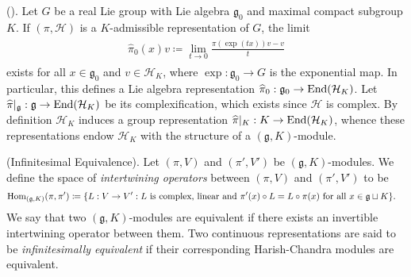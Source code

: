 \noindent\begin{theorem}\textup{(\cite[Theorem 0.3.5]{Vog81}).}\label{ContinuousgKForward} Let $G$ be a real Lie group with Lie algebra $\mathfrak{g}_0$ and maximal compact subgroup $K$. If $(\pi, \mathcal{H})$ is a $K$-admissible representation of $G$, the limit
\begin{align*}
\begin{split}
\widehat{\pi}_0(x)v \coloneqq \lim_{t\to 0}\frac{\pi(\exp(tx))v - v}{t}
\end{split}
\end{align*}
exists for all $x \in \mathfrak{g}_0$ and $v \in \mathcal{H}_K$, where $\exp : \mathfrak{g}_0 \to G$ is the exponential map. In particular, this defines a Lie algebra representation $\widehat{\pi}_0 : \mathfrak{g}_0 \to \textup{End}(\mathcal{H}_K)$. Let $\widehat{\pi}\vert_\mathfrak{g} : \mathfrak{g} \to \textup{End}(\mathcal{H}_K)$ be its complexification, which exists since $\mathcal{H}$ is complex. By definition $\mathcal{H}_K$ induces a group representation $\widehat{\pi}\vert_K : K \to \textup{End}(\mathcal{H}_K)$, whence these representations endow $\mathcal{H}_K$ with the structure of a $(\mathfrak{g}, K)$-module.\\
\end{theorem}

\noindent\begin{definition}\textup{(Infinitesimal Equivalence).} Let $(\pi, V)$ and $(\pi', V')$ be $(\mathfrak{g}, K)$-modules. We define the space of {\em intertwining operators} between $(\pi, V)$ and $(\pi', V')$ to be
\begin{align*}
\begin{split}
\homset_{(\mathfrak{g}, K)}(\pi, \pi') %
&\coloneqq \{L : V \to V' : \textup{$L$ is complex, linear and $\pi'(x) \circ L = L \circ \pi(x)$ for all $x \in \mathfrak{g} \sqcup K$}\}.
\end{split}
\end{align*}
We say that two $(\mathfrak{g}, K)$-modules are equivalent if there exists an invertible intertwining operator between them. Two continuous representations are said to be {\em infinitesimally equivalent} if their corresponding Harish-Chandra modules are equivalent.\newpage
\end{definition}

